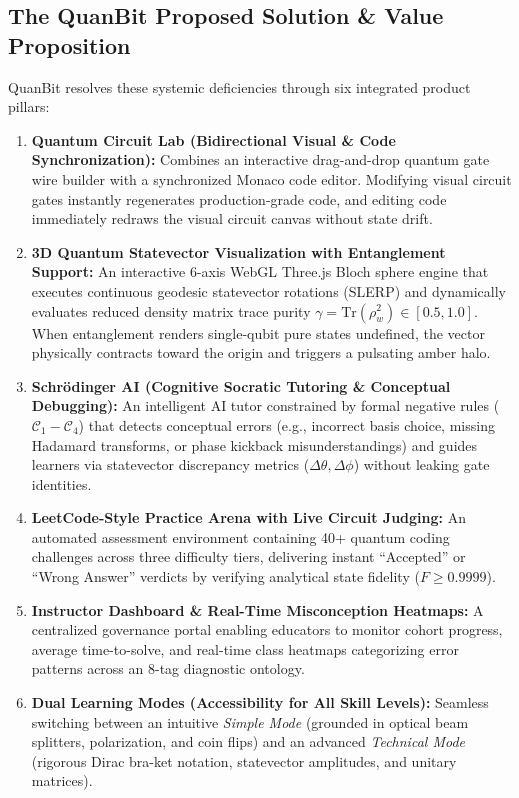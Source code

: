 \documentclass[11pt, a4paper]{article}
\begin{document}
\subsection{The QuanBit Proposed Solution \& Value Proposition}
QuanBit resolves these systemic deficiencies through six integrated product pillars:
\begin{enumerate}[label=\textbf{\arabic*.}]
	\item \textbf{Quantum Circuit Lab (Bidirectional Visual \& Code Synchronization):} Combines an interactive drag-and-drop quantum gate wire builder with a synchronized Monaco code editor. Modifying visual circuit gates instantly regenerates production-grade code, and editing code immediately redraws the visual circuit canvas without state drift.
	\item \textbf{3D Quantum Statevector Visualization with Entanglement Support:} An interactive 6-axis WebGL Three.js Bloch sphere engine that executes continuous geodesic statevector rotations (SLERP) and dynamically evaluates reduced density matrix trace purity $\gamma = \text{Tr}(\rho_w^2) \in [0.5, 1.0]$. When entanglement renders single-qubit pure states undefined, the vector physically contracts toward the origin and triggers a pulsating amber halo.
	\item \textbf{Schr{\"o}dinger AI (Cognitive Socratic Tutoring \& Conceptual Debugging):} An intelligent AI tutor constrained by formal negative rules ($\mathcal{C}_1-\mathcal{C}_4$) that detects conceptual errors (e.g., incorrect basis choice, missing Hadamard transforms, or phase kickback misunderstandings) and guides learners via statevector discrepancy metrics ($\Delta\theta, \Delta\phi$) without leaking gate identities.
	\item \textbf{LeetCode-Style Practice Arena with Live Circuit Judging:} An automated assessment environment containing 40+ quantum coding challenges across three difficulty tiers, delivering instant ``Accepted'' or ``Wrong Answer'' verdicts by verifying analytical state fidelity ($F \ge 0.9999$).
	\item \textbf{Instructor Dashboard \& Real-Time Misconception Heatmaps:} A centralized governance portal enabling educators to monitor cohort progress, average time-to-solve, and real-time class heatmaps categorizing error patterns across an 8-tag diagnostic ontology.
	\item \textbf{Dual Learning Modes (Accessibility for All Skill Levels):} Seamless switching between an intuitive \textit{Simple Mode} (grounded in optical beam splitters, polarization, and coin flips) and an advanced \textit{Technical Mode} (rigorous Dirac bra-ket notation, statevector amplitudes, and unitary matrices).
\end{enumerate}
\end{document}
